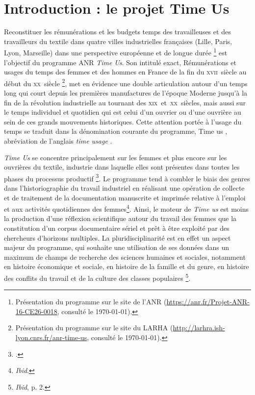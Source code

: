 \section*{Introduction : le projet Time Us}

\bigbreak

\og Reconstituer les rémunérations et les budgets temps des travailleuses et des travailleurs du textile dans quatre villes industrielles françaises (Lille, Paris, Lyon, Marseille) dans une perspective européenne et de longue durée \fg{}\footnote{Présentation du programme sur le site de l'ANR (\url{https://anr.fr/Projet-ANR-16-CE26-0018}, consulté le \today).} est l'objectif du programme ANR \textit{Time Us}. Son intitulé exact, \og Rémunérations et usages du temps des femmes et des hommes en France de la fin du \textsc{xvii}\ieme ~siècle au début du \textsc{xx}\ieme ~siècle \fg{}\footnote{Présentation du programme sur le site du LARHA (\url{http://larhra.ish-lyon.cnrs.fr/anr-time-us}, consulté le \today).}, met en évidence une double articulation autour d'un temps long qui court depuis les premières manufactures de l'époque Moderne jusqu'à la fin de la révolution industrielle au tournant des \textsc{xix}\ieme  ~et~\textsc{xx}\ieme ~siècles, mais aussi sur le temps individuel et quotidien qui est celui d'un ouvrier ou d'une ouvrière au sein de ces grands mouvements historiques. Cette attention portée à l'usage du temps se traduit dans la dénomination courante du programme, \og Time us \fg{}, abréviation de l'anglais \og \textit{time usage} \fg{}.

\textit{Time Us} se concentre principalement sur les femmes et plus encore sur les ouvrières du textile, industrie dans laquelle \og elles sont présentes dans toutes les phases du processus productif \fg{}\footnote{\cite[p. 1]{inria}.}. Le programme tend à combler le biais des genres dans l'historiographie du travail industriel en réalisant une opération de collecte et de traitement de la documentation manuscrite et imprimée relative à l'emploi et aux activités quotidiennes des femmes\footnote{\textit{Ibid}.}.  Ainsi, le moteur de \textit{Time us} est moins la production d'une réflexion scientifique autour du travail des femmes que la constitution d'un corpus documentaire sériel et prêt à être exploité par des chercheurs  d'horizons multiples. La pluridisciplinarité est en effet un aspect majeur du programme, qui souhaite une utilisation de ses données dans un maximum de champs de recherche des sciences humaines et sociales, notamment \og en  histoire économique et sociale, en histoire de la famille et du genre, en histoire des conflits du travail et de la culture des classes populaires \fg{}\footnote{\textit{Ibid}, p. 2.}.

